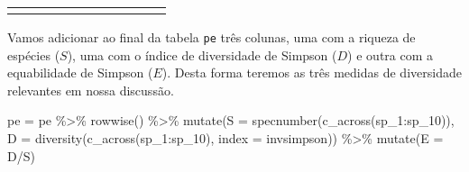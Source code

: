 \documentclass[
]{book}
\newenvironment{Shaded}{\begin{snugshade}}{\end{snugshade}}
\newcommand{\AttributeTok}[1]{\textcolor[rgb]{0.77,0.63,0.00}{#1}}
\newcommand{\FunctionTok}[1]{\textcolor[rgb]{0.00,0.00,0.00}{#1}}
\newcommand{\NormalTok}[1]{#1}
\newcommand{\OtherTok}[1]{\textcolor[rgb]{0.56,0.35,0.01}{#1}}
\newcommand{\SpecialCharTok}[1]{\textcolor[rgb]{0.00,0.00,0.00}{#1}}
\newcommand{\StringTok}[1]{\textcolor[rgb]{0.31,0.60,0.02}{#1}}
\begin{document}
\begin{tabular}{l|r|r|r|r|r|r|r|r|r|r}
\hline
\cellcolor[HTML]{e8867b}{\textcolor{black}{VERAO}} & \cellcolor[HTML]{e8867b}{\textcolor{black}{1}} & \cellcolor[HTML]{e8867b}{\textcolor{black}{0}} & \cellcolor[HTML]{e8867b}{\textcolor{black}{0}} & \cellcolor[HTML]{e8867b}{\textcolor{black}{3}} & \cellcolor[HTML]{e8867b}{\textcolor{black}{0}} & \cellcolor[HTML]{e8867b}{\textcolor{black}{2}} & \cellcolor[HTML]{e8867b}{\textcolor{black}{0}} & \cellcolor[HTML]{e8867b}{\textcolor{black}{0}} & \cellcolor[HTML]{e8867b}{\textcolor{black}{1}} & \cellcolor[HTML]{e8867b}{\textcolor{black}{0}}\\
\hline
\cellcolor[HTML]{e8867b}{\textcolor{black}{VERAO}} & \cellcolor[HTML]{e8867b}{\textcolor{black}{1}} & \cellcolor[HTML]{e8867b}{\textcolor{black}{0}} & \cellcolor[HTML]{e8867b}{\textcolor{black}{0}} & \cellcolor[HTML]{e8867b}{\textcolor{black}{0}} & \cellcolor[HTML]{e8867b}{\textcolor{black}{0}} & \cellcolor[HTML]{e8867b}{\textcolor{black}{7}} & \cellcolor[HTML]{e8867b}{\textcolor{black}{0}} & \cellcolor[HTML]{e8867b}{\textcolor{black}{0}} & \cellcolor[HTML]{e8867b}{\textcolor{black}{0}} & \cellcolor[HTML]{e8867b}{\textcolor{black}{1}}\\
\hline
\end{tabular}

Vamos adicionar ao final da tabela \texttt{pe} três colunas, uma com a riqueza de espécies (\(S\)), uma com o índice de diversidade de Simpson (\(D\)) e outra com a equabilidade de Simpson (\(E\)). Desta forma teremos as três medidas de diversidade relevantes em nossa discussão.

\begin{Shaded}
\begin{Highlighting}[]
\NormalTok{pe }\OtherTok{=}\NormalTok{ pe }\SpecialCharTok{\%\textgreater{}\%}
  \FunctionTok{rowwise}\NormalTok{() }\SpecialCharTok{\%\textgreater{}\%} 
  \FunctionTok{mutate}\NormalTok{(}\AttributeTok{S =} \FunctionTok{specnumber}\NormalTok{(}\FunctionTok{c\_across}\NormalTok{(sp\_1}\SpecialCharTok{:}\NormalTok{sp\_10)),}
         \AttributeTok{D =} \FunctionTok{diversity}\NormalTok{(}\FunctionTok{c\_across}\NormalTok{(sp\_1}\SpecialCharTok{:}\NormalTok{sp\_10), }
                       \AttributeTok{index =} \StringTok{\textquotesingle{}invsimpson\textquotesingle{}}\NormalTok{)) }\SpecialCharTok{\%\textgreater{}\%} 
  \FunctionTok{mutate}\NormalTok{(}\AttributeTok{E =}\NormalTok{ D}\SpecialCharTok{/}\NormalTok{S)}
\end{Highlighting}
\end{Shaded}
\end{document}
